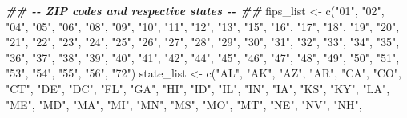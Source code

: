 \documentclass[
  11 pt,
  openany]{book}
\newenvironment{Shaded}{\begin{snugshade}}{\end{snugshade}}
\newcommand{\DocumentationTok}[1]{\textcolor[rgb]{0.56,0.35,0.01}{\textbf{\textit{#1}}}}
\newcommand{\FunctionTok}[1]{\textcolor[rgb]{0.00,0.00,0.00}{#1}}
\newcommand{\NormalTok}[1]{#1}
\newcommand{\OtherTok}[1]{\textcolor[rgb]{0.56,0.35,0.01}{#1}}
\newcommand{\StringTok}[1]{\textcolor[rgb]{0.31,0.60,0.02}{#1}}
\begin{document}
\begin{Shaded}
\begin{Highlighting}[]
\DocumentationTok{\#\# {-}{-} ZIP codes and respective states {-}{-} \#\#}
\NormalTok{fips\_list }\OtherTok{\textless{}{-}} 
  \FunctionTok{c}\NormalTok{(}\StringTok{"01"}\NormalTok{, }\StringTok{"02"}\NormalTok{, }\StringTok{"04"}\NormalTok{, }\StringTok{"05"}\NormalTok{, }\StringTok{"06"}\NormalTok{, }\StringTok{"08"}\NormalTok{, }\StringTok{"09"}\NormalTok{, }\StringTok{"10"}\NormalTok{, }\StringTok{"11"}\NormalTok{, }\StringTok{"12"}\NormalTok{, }
    \StringTok{"13"}\NormalTok{, }\StringTok{"15"}\NormalTok{, }\StringTok{"16"}\NormalTok{, }\StringTok{"17"}\NormalTok{, }\StringTok{"18"}\NormalTok{, }\StringTok{"19"}\NormalTok{, }\StringTok{"20"}\NormalTok{, }\StringTok{"21"}\NormalTok{, }\StringTok{"22"}\NormalTok{, }\StringTok{"23"}\NormalTok{, }
    \StringTok{"24"}\NormalTok{, }\StringTok{"25"}\NormalTok{, }\StringTok{"26"}\NormalTok{, }\StringTok{"27"}\NormalTok{, }\StringTok{"28"}\NormalTok{, }\StringTok{"29"}\NormalTok{, }\StringTok{"30"}\NormalTok{, }\StringTok{"31"}\NormalTok{, }\StringTok{"32"}\NormalTok{, }\StringTok{"33"}\NormalTok{, }
    \StringTok{"34"}\NormalTok{, }\StringTok{"35"}\NormalTok{, }\StringTok{"36"}\NormalTok{, }\StringTok{"37"}\NormalTok{, }\StringTok{"38"}\NormalTok{, }\StringTok{"39"}\NormalTok{, }\StringTok{"40"}\NormalTok{, }\StringTok{"41"}\NormalTok{, }\StringTok{"42"}\NormalTok{, }\StringTok{"44"}\NormalTok{, }
    \StringTok{"45"}\NormalTok{, }\StringTok{"46"}\NormalTok{, }\StringTok{"47"}\NormalTok{, }\StringTok{"48"}\NormalTok{, }\StringTok{"49"}\NormalTok{, }\StringTok{"50"}\NormalTok{, }\StringTok{"51"}\NormalTok{, }\StringTok{"53"}\NormalTok{, }\StringTok{"54"}\NormalTok{, }\StringTok{"55"}\NormalTok{, }
    \StringTok{"56"}\NormalTok{, }\StringTok{"72"}\NormalTok{)}
\NormalTok{state\_list }\OtherTok{\textless{}{-}} 
  \FunctionTok{c}\NormalTok{(}\StringTok{"AL"}\NormalTok{, }\StringTok{"AK"}\NormalTok{, }\StringTok{"AZ"}\NormalTok{, }\StringTok{"AR"}\NormalTok{, }\StringTok{"CA"}\NormalTok{, }\StringTok{"CO"}\NormalTok{, }\StringTok{"CT"}\NormalTok{, }\StringTok{"DE"}\NormalTok{, }\StringTok{"DC"}\NormalTok{, }\StringTok{"FL"}\NormalTok{,}
    \StringTok{"GA"}\NormalTok{, }\StringTok{"HI"}\NormalTok{, }\StringTok{"ID"}\NormalTok{, }\StringTok{"IL"}\NormalTok{, }\StringTok{"IN"}\NormalTok{, }\StringTok{"IA"}\NormalTok{, }\StringTok{"KS"}\NormalTok{, }\StringTok{"KY"}\NormalTok{, }\StringTok{"LA"}\NormalTok{, }\StringTok{"ME"}\NormalTok{,}
    \StringTok{"MD"}\NormalTok{, }\StringTok{"MA"}\NormalTok{, }\StringTok{"MI"}\NormalTok{, }\StringTok{"MN"}\NormalTok{, }\StringTok{"MS"}\NormalTok{, }\StringTok{"MO"}\NormalTok{, }\StringTok{"MT"}\NormalTok{, }\StringTok{"NE"}\NormalTok{, }\StringTok{"NV"}\NormalTok{, }\StringTok{"NH"}\NormalTok{,}

\end{Highlighting}
\end{Shaded}
\end{document}
